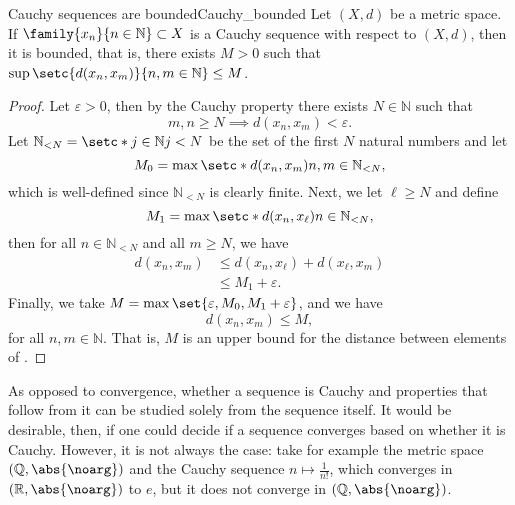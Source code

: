 \begin{proposition}{Cauchy sequences are bounded}{Cauchy_bounded}
    Let \((X, d)\) be a metric space. If \(\family{x_n}{n\in \mathbb{N}}\subset X\) is a Cauchy sequence with respect to \((X,d)\), then it is bounded, that is, there exists \(M > 0\) such that  \(\sup\setc{d(x_n, x_m)}{n,m \in \mathbb{N}} \leq M\).
\end{proposition}
\begin{proof}
    Let \(\varepsilon > 0\), then by the Cauchy property there exists \(N \in \mathbb{N}\) such that
    \begin{equation*}
        m,n \geq N \implies d(x_n, x_m) < \varepsilon.
    \end{equation*}
    Let \(\mathbb{N}_{< N} = \setc*{j \in \mathbb{N}}{j < N}\) be the set of the first \(N\) natural numbers and let
    \begin{equation*}
        M_0 = \max\setc*{d(x_n, x_m)}{n,m \in \mathbb{N}_{< N}},
    \end{equation*}
    which is well-defined since \(\mathbb{N}_{< N}\) is clearly finite. Next, we let \(\ell \geq N\) and define
    \begin{equation*}
        M_1 = \max\setc*{d(x_n, x_\ell)}{n \in \mathbb{N}_{< N}},
    \end{equation*}
    then for all \(n \in \mathbb{N}_{<N}\) and all \(m \geq N\), we have
    \begin{align*}
        d(x_n, x_m) &\leq d(x_n, x_\ell) + d(x_\ell, x_m)\\
                    &\leq M_1 + \varepsilon.
    \end{align*}
    Finally, we take \(M = \max\set{\varepsilon, M_0, M_1 + \varepsilon}\), and we have
    \begin{equation*}
        d(x_n, x_m) \leq M,
    \end{equation*}
    for all \(n, m \in \mathbb{N}\). That is, \(M\) is an upper bound for the distance between elements of .
\end{proof}

As opposed to convergence, whether a sequence is Cauchy and properties that follow from it can be studied solely from the sequence itself. It would be desirable, then, if one could decide if a sequence converges based on whether it is Cauchy. However, it is not always the case: take for example the metric space \((\mathbb{Q}, \abs{\noarg})\) and the Cauchy sequence \(n \mapsto \frac{1}{n!}\), which converges in \((\mathbb{R}, \abs{\noarg})\) to \(e\), but it does not converge in \((\mathbb{Q}, \abs{\noarg})\).

